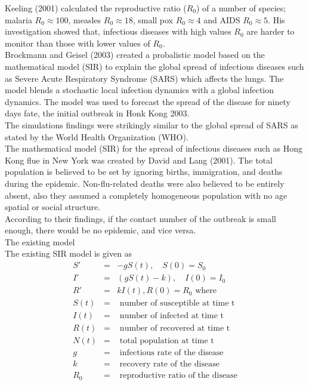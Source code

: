 \documentclass[12pt]{report}
\newcommand{\spn}[1]{\\[#1cm]}
\newcommand{\NI}{\noindent}
\begin{document}
	\NI Keeling (2001) calculated the reproductive ratio ($R_0$) of a number of species; malaria $R_0 \approx 100$, measles $R_0 \approx 18$, small pox $R_0 \approx 4$ and AIDS $R_0 \approx 5$. His investigation showed that, infectious diseases with high values $R_0$ are harder to monitor than those with lower values of $R_0$.\\
	
	\NI Brockmann and Geisel (2003) created a probalistic model based on the mathematical model (SIR) to explain the global spread of infectious diseases such as Severe Acute Respiratory Syndrome (SARS) which affects the lungs. The model blends a stochastic local infection dynamics with a global infection dynamics. The model was used to forecast the spread of the disease for ninety days fate, the initial outbreak in Honk Kong 2003.\\
	
	\NI The simulations findings were strikingly similar to the global spread of SARS as stated by the World Health Organization (WHO).\\
	
	\NI The mathematical model (SIR) for the spread of infectious diseases such as Hong Kong flue in New York was created by David and Lang (2001). The total population is believed to be set by ignoring births, immigration, and deaths during the epidemic. Non-flu-related deaths were also believed to be entirely absent, also they assumed a completely homogeneous population with no age spatial or social structure.\\
	
	\NI According to their findings, if the contact number of the outbreak is small enough, there would be no epidemic, and vice versa.\\
	\newpage
	\NI The existing model\\
	The existing SIR model is given as\\
	\begin{eqnarray*}
		S' &=& -gS(t), \quad S(0) = S_0 \\
		I' &=& (gS(t) - k), \quad I(0) = I_0\\
		R' &=& kI(t), R(0) = R_0 \text{ where} \spn{0.6}
		S(t) &=& \text{ number of susceptible at time t}\\
		I(t) &=& \text{ number of infected at time t}\\
		R(t) &=& \text{ number of recovered at time t}\\
		N(t) &=& \text{ total population at time t}\\
		g &=& \text{ infectious rate of the disease}\\
		k &=& \text{ recovery rate of the disease}\\
		R_0 &=& \text{ reproductive ratio of the disease}\\
	\end{eqnarray*} 
\end{document}
